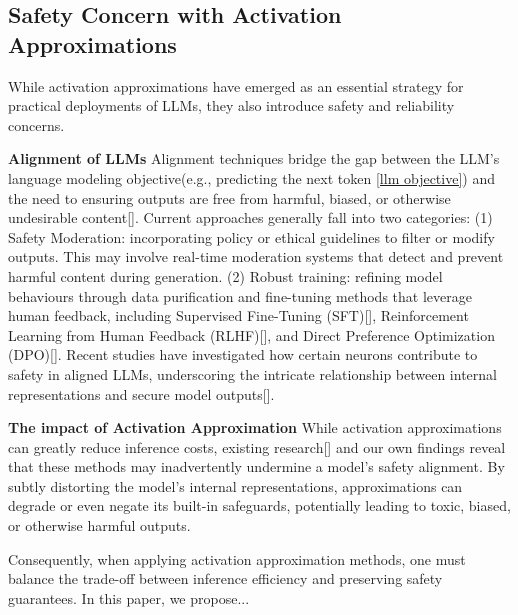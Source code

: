\subsection{Safety Concern with Activation Approximations}
While activation approximations have emerged as an essential strategy for practical deployments of LLMs, they also introduce safety and reliability concerns. 

\noindent \textbf{Alignment of LLMs} Alignment techniques bridge the gap between the LLM's language modeling objective(e.g., predicting the next token \ref{llm objective}) and the need to ensuring outputs are free from harmful, biased, or otherwise undesirable content[]. Current approaches generally fall into two categories: (1) Safety Moderation: incorporating policy or ethical guidelines to filter or modify outputs. This may involve real-time moderation systems that detect and prevent harmful content during generation. (2) Robust training: refining model behaviours through data purification and fine-tuning methods that leverage human feedback, including Supervised Fine-Tuning (SFT)[], Reinforcement Learning from Human Feedback (RLHF)[], and Direct Preference Optimization (DPO)[]. Recent studies have investigated how certain neurons contribute to safety in aligned LLMs, underscoring the intricate relationship between internal representations and secure model outputs[].

\textbf{The impact of Activation Approximation} While activation approximations can greatly reduce inference costs, existing research[] and our own findings reveal that these methods may inadvertently undermine a model’s safety alignment. By subtly distorting the model’s internal representations, approximations can degrade or even negate its built-in safeguards, potentially leading to toxic, biased, or otherwise harmful outputs.

Consequently, when applying activation approximation methods, one must balance the trade-off between inference efficiency and preserving safety guarantees. In this paper, we propose...

